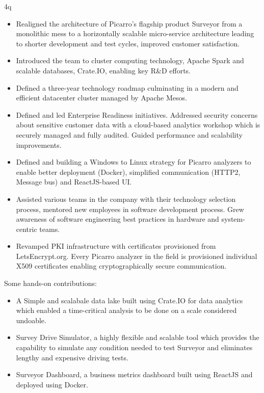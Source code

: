 4q\documentclass[a4paper, 13pt,line]{article}
\begin{document}
\bigskip
\begin{itemize}
\item Realigned the architecture of Picarro's flagship product
  Surveyor from a monolithic mess to a horizontally scalable
  micro-service architecture leading to shorter development and
  test cycles, improved customer satisfaction.
\item Introduced the team to cluster computing technology, Apache
  Spark and scalable databases, Crate.IO, enabling key R\&D
  efforts.
\item Defined a three-year technology roadmap culminating in a modern
  and efficient datacenter cluster managed by Apache Mesos.
\item Defined and led Enterprise Readiness initiatives. Addressed
  security concerns about sensitive customer data with a cloud-based
  analytics workshop which is securely managed and fully
  audited. Guided performance and scalability improvements.
\item Defined and building a Windows to Linux strategy for Picarro
  analyzers to enable better deployment (Docker), simplified
  communication (HTTP2, Message bus) and ReactJS-based UI.
\item Assisted various teams in the company with their technology
  selection process, mentored new employees in software development
  process. Grew awareness of software engineering best practices in
  hardware and system-centric teams.
\item Revamped PKI infrastructure with certificates provisioned from
  LetsEncrypt.org. Every Picarro analyzer in the field is provisioned
  individual X509 certificates enabling cryptographically secure
  communication.
\end{itemize}

\bigskip\noindent Some hands-on contributions:
\begin{itemize}
\item A Simple and scalabale data lake built using Crate.IO for data
  analytics which enabled a time-critical analysis to be done on a
  scale considered undoable.
\item Survey Drive Simulator, a highly flexible and scalable tool
  which provides the capability to simulate any condition needed to
  test Surveyor and eliminates lengthy and expensive driving tests.
\item Surveyor Dashboard, a business metrics dashboard built using
  ReactJS and deployed using Docker.
\end{itemize}
\end{document}
